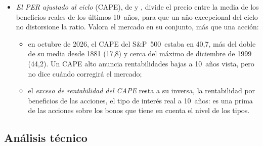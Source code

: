 \documentclass[11pt]{article}
\begin{document}
\begin{itemize}
\begin{itemize}
  \item \emph{indirectos}, que valoran todo el negocio y restan después la deuda neta: el , el valor de la empresa (\emph{enterprise value}, $\mathrm{EV}$, valor de mercado de los fondos propios más la deuda neta) entre el resultado de explotación.\footnote{El EBIT es el resultado de explotación, antes del resultado financiero y de los impuestos . Si se comparan empresas con regímenes fiscales distintos, es mejor usar el resultado de explotación después de impuestos.} No depende del endeudamiento.
  \end{itemize}
  Si las comparables tienen distinto apalancamiento, el PER deja de ser comparable y conviene el EV/EBIT; con un apalancamiento parecido, el PER sirve. Los demás múltiplos y sus ventajas e inconvenientes se estudian aparte .
\item \emph{El PER ajustado al ciclo} (CAPE), de  y , divide el precio entre la media de los beneficios reales de los últimos 10~años, para que un año excepcional del ciclo no distorsione la ratio\nocite{CampbellShiller1988}. Valora el mercado en su conjunto, más que una acción:
  \begin{itemize}
  \item en octubre de 2026, el CAPE del S\&P~500~estaba en 40,7, más del doble de su media desde 1881 (17,8) y cerca del máximo de diciembre de 1999 (44,2)\nocite{Shiller2026Data}. Un CAPE alto anuncia rentabilidades bajas a 10~años vista, pero no dice cuándo corregirá el mercado\nocite{CampbellShiller1998};
  \item el \emph{exceso de rentabilidad del CAPE} resta a su inversa, la rentabilidad por beneficios de las acciones, el tipo de interés real a 10~años: es una prima de las acciones sobre los bonos que tiene en cuenta el nivel de los tipos.
  \end{itemize}
\end{itemize}

\subsection{Análisis técnico}\label{sec:tecnico}
\end{document}
